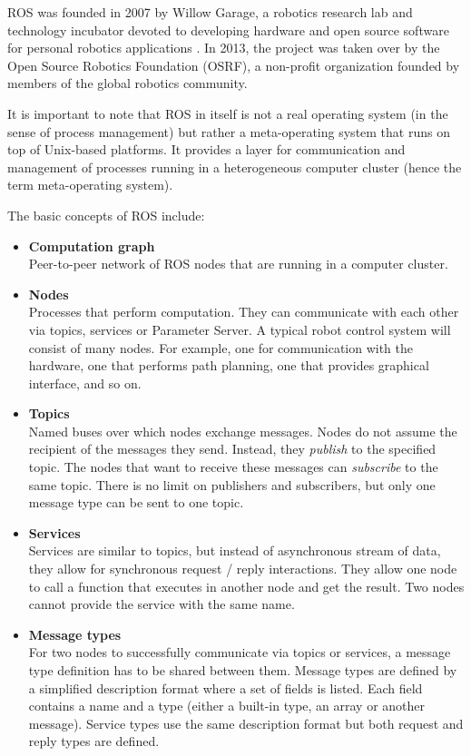 \documentclass[english,inz,shortabstract]{iithesis}
\begin{document}
    ROS was founded in 2007 by Willow Garage, a robotics research lab and technology incubator devoted to developing hardware and open source software for personal robotics applications \cite{ros:willowgarage}. In 2013, the project was taken over by the Open Source Robotics Foundation (OSRF), a non-profit organization founded by members of the global robotics community.

    It is important to note that ROS in itself is not a real operating system (in the sense of process management) but rather a meta-operating system that runs on top of Unix-based platforms. It provides a layer for communication and management of processes running in a heterogeneous computer cluster (hence the term meta-operating system).

    The basic concepts of ROS include:
    \begin{itemize}
        \item \textbf{Computation graph}\\
        Peer-to-peer network of ROS nodes that are running in a computer cluster.
        \item \textbf{Nodes}\\
        Processes that perform computation. They can communicate with each other via topics, services or Parameter Server. A typical robot control system will consist of many nodes. For example, one for communication with the hardware, one that performs path planning, one that provides graphical interface, and so on.
        \item \textbf{Topics}\\
        Named buses over which nodes exchange messages. Nodes do not assume the recipient of the messages they send. Instead, they \textit{publish} to the specified topic. The nodes that want to receive these messages can \textit{subscribe} to the same topic. There is no limit on publishers and subscribers, but only one message type can be sent to one topic.
        \item \textbf{Services}\\
        Services are similar to topics, but instead of asynchronous stream of data, they allow for synchronous request / reply interactions. They allow one node to call a function that executes in another node and get the result. Two nodes cannot provide the service with the same name.
        \item \textbf{Message types}\\
        For two nodes to successfully communicate via topics or services, a message type definition has to be shared between them. Message types are defined by a simplified description format where a set of fields is listed. Each field contains a name and a type (either a built-in type, an array or another message). Service types use the same description format but both request and reply types are defined.

\end{itemize}
\end{document}
